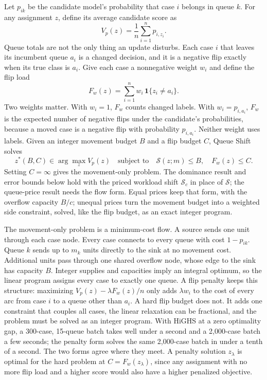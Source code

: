 \documentclass[11pt]{article}
\newcommand{\shift}{\mathcal{S}}
\newcommand{\valuefn}{V}
\begin{document}
Let $p_{ik}$ be the candidate model's probability that case $i$ belongs in queue $k$. For any
assignment $z$, define its average candidate score as
\[
  \valuefn_p(z)=\frac{1}{n}\sum_{i=1}^n p_{i,z_i}.
\]
Queue totals are not the only thing an update disturbs. Each case $i$ that leaves its incumbent
queue $a_i$ is a changed decision, and it is a negative flip exactly when its true class is $a_i$.
Give each case a nonnegative weight $w_i$ and define the flip load
\[
  F_w(z)=\sum_{i=1}^n w_i\,\mathbf{1}\{z_i\neq a_i\}.
\]
Two weights matter. With $w_i=1$, $F_w$ counts changed labels. With $w_i=p_{i,a_i}$, $F_w$ is the
expected number of negative flips under the candidate's probabilities, because a moved case is a
negative flip with probability $p_{i,a_i}$. Neither weight uses labels. Given an integer movement
budget $B$ and a flip budget $C$, Queue Shift solves
\begin{equation}
  z^*(B,C)\in\arg\max_z \valuefn_p(z)
  \quad\text{subject to}\quad \shift(z;m)\leq B,\quad F_w(z)\leq C.
  \label{eq:assignment}
\end{equation}
Setting $C=\infty$ gives the movement-only problem. The dominance result and error bounds
below hold with the priced workload shift $\shift_c$ in place of $\shift$; the queue-price result
needs the flow form. Equal prices keep that form, with the overflow
capacity $B/c$; unequal prices turn the movement budget into a weighted side constraint, solved,
like the flip budget, as an exact integer program.

The movement-only problem is a minimum-cost flow. A source sends one unit through each case node.
Every case connects to every queue with cost $1-p_{ik}$. Queue $k$ sends up to $m_k$ units directly
to the sink at no movement cost. Additional units pass through one shared overflow node, whose edge
to the sink has capacity $B$. Integer supplies and capacities imply an integral optimum, so the
linear program assigns every case to exactly one queue. A flip penalty keeps this structure:
maximizing $\valuefn_p(z)-\lambda F_w(z)/n$ only adds $\lambda w_i$ to the cost of every arc from
case $i$ to a queue other than $a_i$. A hard flip budget does not. It adds one constraint that
couples all cases, the linear relaxation can be fractional, and the problem must be solved as an
integer program. With HiGHS at a zero optimality gap, a 300-case, 15-queue batch takes well under
a second and a 2,000-case batch a few seconds; the penalty form solves the same 2,000-case batch in
under a tenth of a second. The two forms agree where they meet. A penalty solution $z_\lambda$ is
optimal for the hard problem at $C=F_w(z_\lambda)$, since any assignment with no more flip load and
a higher score would also have a higher penalized objective.
\end{document}
